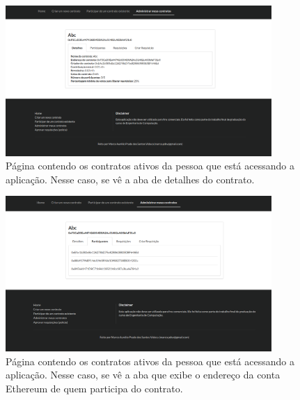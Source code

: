 \begin{figure}[h!]
\centering
\includegraphics[width=0.9\textwidth]{Cap2/my_contracts_details.png}
\caption{Página contendo os contratos ativos da pessoa que está acessando a aplicação. Nesse caso, se vê a aba de detalhes do contrato.}
\label{my_contracts_details}
\end{figure}

\begin{figure}[h!]
\centering
\includegraphics[width=0.9\textwidth]{Cap2/my_contracts_participants.png}
\caption{Página contendo os contratos ativos da pessoa que está acessando a aplicação. Nesse caso, se vê a aba que exibe o endereço da conta Ethereum de quem participa do contrato.}
\label{my_contracts_participants}
\end{figure}

